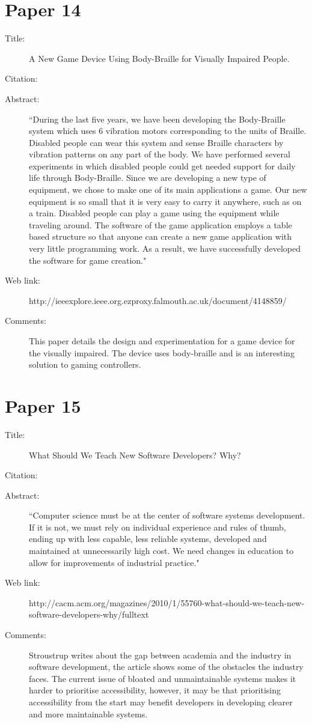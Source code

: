 \documentclass{scrartcl}
\begin{document}
\section*{Paper 14}
\begin{description}
\item[Title:] A New Game Device Using Body-Braille for Visually Impaired People.
\item[Citation:] \cite{Ohtsuka}
\item[Abstract:] ``During the last five years, we have been developing the Body-Braille system which uses 6 vibration motors corresponding to the units of Braille. Disabled people can wear this system and sense Braille characters by vibration patterns on any part of the body. We have performed several experiments in which disabled people could get needed support for daily life through Body-Braille. Since we are developing a new type of equipment, we chose to make one of its main applications a game. Our new equipment is so small that it is very easy to carry it anywhere, such as on a train. Disabled people can play a game using the equipment while traveling around. The software of the game application employs a table based structure so that anyone can create a new game application with very little programming work. As a result, we have successfully developed the software for game creation."
\item[Web link:] http://ieeexplore.ieee.org.ezproxy.falmouth.ac.uk/document/4148859/
\item[Comments:] This paper details the design and experimentation for a game device for the visually impaired. The device uses body-braille and is an interesting solution to gaming controllers. 
\end{description}

\section*{Paper 15}
\begin{description}
\item[Title:] What Should We Teach New Software Developers? Why?
\item[Citation:] \cite{softwaredevelopers}
\item[Abstract:] ``Computer science must be at the center of software systems development. If it is not, we must rely on individual experience and rules of thumb, ending up with less capable, less reliable systems, developed and maintained at unnecessarily high cost. We need changes in education to allow for improvements of industrial practice."
\item[Web link:] http://cacm.acm.org/magazines/2010/1/55760-what-should-we-teach-new-software-developers-why/fulltext
\item[Comments:] Stroustrup writes about the gap between academia and the industry in software development, the article shows some of the obstacles the industry faces. The current issue of bloated and unmaintainable systems makes it harder to prioritise accessibility, however, it may be that prioritising accessibility from the start may benefit developers in developing clearer and more maintainable systems.
\end{description}



\end{document}
